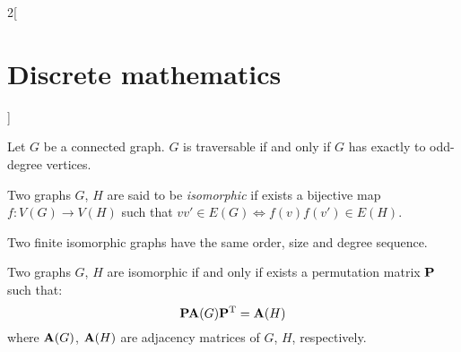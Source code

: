 \documentclass[../../../main.tex]{subfiles}
\begin{document}
\begin{multicols}{2}[\section{Discrete mathematics}]
\begin{definition}
    \end{definition}
    \begin{theorem}
        Let $G$ be a connected graph. $G$ is traversable if and only if $G$ has exactly to odd-degree vertices.
    \end{theorem}
    \begin{definition}
        Two graphs $G$, $H$ are said to be \textit{isomorphic} if exists a bijective map $f:V(G)\rightarrow V(H)$ such that $vv'\in E(G)\iff f(v)f(v')\in E(H)$.
    \end{definition}
    \begin{prop}
        Two finite isomorphic graphs have the same order, size and degree sequence.
    \end{prop}
    \begin{theorem}
        Two graphs $G$, $H$ are isomorphic if and only if exists a permutation matrix $\vb{P}$ such that: $$\vb{P}\vb{A}(G)\vb{P}^{\mathrm{T}}=\vb{A}(H)$$ where $\vb{A}(G)$, $\vb{A}(H)$ are adjacency matrices of $G$, $H$, respectively.
    \end{theorem}

\end{multicols}
\end{document}
